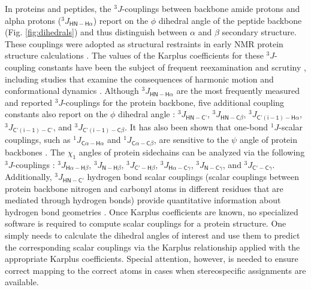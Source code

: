 \documentclass[9pt,review]{livecoms}
\begin{document}
In proteins and peptides, the $^3J$-couplings between backbone amide protons and alpha protons ($^3J_{\mathsf{HN-H\alpha}}$) report on the $\phi$ dihedral angle of the peptide backbone (Fig. \ref{fig:dihedrals}) and thus distinguish between $\alpha$ and $\beta$ secondary structure.
These couplings were adopted as structural restraints in early NMR protein structure calculations \cite{pardi_calibration_1984}.
The values of the Karplus coefficients for these $^3J$-coupling constants have been the subject of frequent reexamination and scrutiny \cite{case_static_2000,lindorff-larsen_interpreting_2005,altona_vicinal_2007,vogeli_limits_2007,wang_quantum_2013,lee_quantitative_2015,li_high_2015}, including studies that examine the consequences of harmonic motion and conformational dynamics \cite{brueschweiler_adding_1994,case_static_2000,lindorff-larsen_interpreting_2005,vogeli_limits_2007,lee_quantitative_2015}.
Although $^3J_{\mathsf{HN-H\alpha}}$ are the most frequently measured and reported $^3J$-couplings for the protein backbone, five additional coupling constants also report on the $\phi$ dihedral angle \cite{schmidt_self-consistent_1999}: $^3J_{\mathsf{HN-C’}}$, $^3J_{\mathsf{HN-C\beta}}$, $^3J_{\mathsf{C’(i-1)-H\alpha}}$, $^3J_{\mathsf{C’(i-1)-C’}}$, and $^3J_{\mathsf{C’(i-1)-C\beta}}$.
It has also been shown that one-bond $^1J$-scalar couplings, such as $^1J_{\mathsf{C\alpha-H\alpha}}$ and $^1J_{\mathsf{C\alpha-C\beta}}$, are sensitive to the $\psi$ angle of protein backbones \cite{vuister_use_1993,cornilescu_large_2000,gapsys_improved_2015}.
The $\chi_1$ angles of protein sidechains can be analyzed via the following $^3J$-couplings \cite{perez_self-consistent_2001,chou_insights_2003}: $^3J_{\mathsf{H\alpha-H\beta}}$, $^3J_{\mathsf{N-H\beta}}$, $^3J_{\mathsf{C'-H\beta}}$, $^3J_{\mathsf{H\alpha-C\gamma}}$, $^3J_{\mathsf{N-C\gamma}}$, and $^3J_{\mathsf{C'-C\gamma}}$.
Additionally, $^3J_{\mathsf{HN-C'}}$ hydrogen bond scalar couplings (scalar couplings between protein backbone nitrogen and carbonyl atoms in different residues that are mediated through hydrogen bonds) provide quantitative information about hydrogen bond geometries \cite{barfield_structural_2002}.
Once Karplus coefficients are known, no specialized software is required to compute scalar couplings for a protein structure.
One simply needs to calculate the dihedral angles of interest and use them to predict the corresponding scalar couplings via the Karplus relationship applied with the appropriate Karplus coefficients. Special attention, however, is needed to ensure correct mapping to the correct atoms in cases when stereospecific assignments are available.
\end{document}
